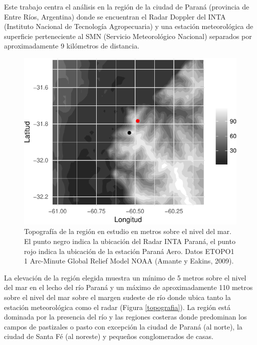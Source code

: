 \documentclass[12pt,spanish,oneside]{book}
\begin{document}
Este trabajo centra el análisis en la región de la ciudad de Paraná
(provincia de Entre Ríos, Argentina) donde se encuentran el Radar
Doppler del INTA (Instituto Nacional de Tecnología Agropecuaria) y una
estación meteorológica de superficie perteneciente al SMN (Servicio
Meteorológico Nacional) separados por aproximadamente 9 kilómetros de
distancia.

\begin{figure}

{\centering \includegraphics{Tesis_files/figure-latex/topografia-1} 

}

\caption[Topografía de la región en estudio en metros sobre el nivel del mar.]{Topografía de la región en estudio en metros sobre el nivel del mar. El punto negro indica la ubicación del Radar INTA Paraná, el punto rojo indica la ubicación de la estación Paraná Aero. Datos ETOPO1 1 Arc-Minute Global Relief Model NOAA (Amante y Eakins, 2009). \label{topografia}}\label{fig:topografia}
\end{figure}

La elevación de la región elegida muestra un mínimo de 5 metros sobre el
nivel del mar en el lecho del río Paraná y un máximo de aproximadamente
110 metros sobre el nivel del mar sobre el margen sudeste de río donde
ubica tanto la estación meteorológica como el radar (Figura
\ref{topografia}). La región está dominada por la presencia del río y
las regiones costeras donde predominan los campos de pastizales o pasto
con excepción la ciudad de Paraná (al norte), la ciudad de Santa Fé (al
noreste) y pequeños conglomerados de casas.
\end{document}
